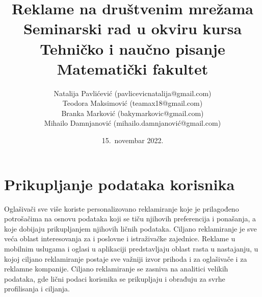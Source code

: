 \documentclass[a4paper]{article}
\title{Reklame na društvenim mrežama\\ \small{Seminarski rad u okviru kursa\\Tehničko i naučno pisanje\\ Matematički fakultet}}
\author{Natalija Pavlićević (pavlicevicnatalija@gmail.com)\\ Teodora Maksimović (teamax18@gmail.com)\\ Branka Marković (bakymarkovic@gmail.com)\\ Mihailo Damnjanović (mihailo.damnjanović@gmail.com)}
\date{15.~novembar 2022.}
\begin{document}
	
	\section{Prikupljanje podataka korisnika}
	\label{sec:podaci}
	Oglašivači sve više koriste personalizovano reklamiranje koje je prilagođeno potrošačima na osnovu podataka koji se tiču njihovih preferencija i ponašanja, a koje dobijaju prikupljanjem njihovih ličnih podataka. Ciljano reklamiranje je sve veća oblast interesovanja za i poslovne i istraživačke zajednice. Reklame u mobilnim uslugama i oglasi u aplikaciji predstavljaju oblast rasta u nastajanju, u kojoj ciljano reklamiranje postaje sve važniji izvor prihoda i za oglašivače i za reklamne kompanije. Ciljano reklamiranje se zasniva na analitici velikih podataka, gde lični podaci korisnika se prikupljaju i obrađuju za svrhe profilisanja i ciljanja.
\end{document}
